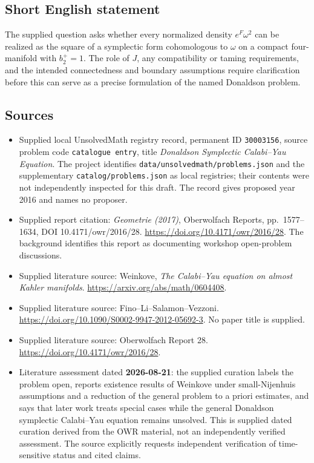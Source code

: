 \documentclass[11pt]{article}
\begin{document}
\subsection{Short English statement}
The supplied question asks whether every normalized density \(e^F\omega^2\) can be realized as the square of a symplectic form cohomologous to \(\omega\) on a compact four-manifold with \(b_2^+=1\). The role of \(J\), any compatibility or taming requirements, and the intended connectedness and boundary assumptions require clarification before this can serve as a precise formulation of the named Donaldson problem.
\subsection{Sources}
\begin{itemize}
\item Supplied local UnsolvedMath registry record, permanent ID \texttt{30003156}, source problem code \texttt{catalogue entry}, title \emph{Donaldson Symplectic Calabi--Yau Equation}. The project identifies \texttt{data/unsolvedmath/problems.json} and the supplementary \texttt{catalog/problems.json} as local registries; their contents were not independently inspected for this draft. The record gives proposed year 2016 and names no proposer.
\item Supplied report citation: \emph{Geometrie (2017)}, Oberwolfach Reports, pp.\ 1577--1634, DOI 10.4171/owr/2016/28. \url{https://doi.org/10.4171/owr/2016/28}. The background identifies this report as documenting workshop open-problem discussions.
\item Supplied literature source: Weinkove, \emph{The Calabi--Yau equation on almost Kahler manifolds}. \url{https://arxiv.org/abs/math/0604408}.
\item Supplied literature source: Fino--Li--Salamon--Vezzoni. \url{https://doi.org/10.1090/S0002-9947-2012-05692-3}. No paper title is supplied.
\item Supplied literature source: Oberwolfach Report 28. \url{https://doi.org/10.4171/owr/2016/28}.
\item Literature assessment dated \textbf{2026-08-21}: the supplied curation labels the problem open, reports existence results of Weinkove under small-Nijenhuis assumptions and a reduction of the general problem to a priori estimates, and says that later work treats special cases while the general Donaldson symplectic Calabi--Yau equation remains unsolved. This is supplied dated curation derived from the OWR material, not an independently verified assessment. The source explicitly requests independent verification of time-sensitive status and cited claims.
\end{itemize}
\end{document}

